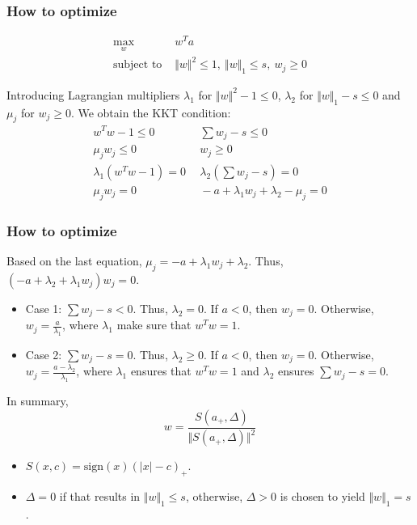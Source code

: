 \documentclass{beamer}
\begin{document}
\begin{frame}
\frametitle{How to optimize}

\begin{eqnarray*}
\max_{w} & w^Ta\\
\text{subject to } & \Vert w \Vert^2 \le 1,~ \Vert w \Vert_1 \le s, ~ w_j \ge 0
\end{eqnarray*}

Introducing Lagrangian multipliers $\lambda_1$ for $\Vert w \Vert^2 -1 \le 0$, $\lambda_2$ for $\Vert w \Vert_1 - s \le 0$ and $\mu_j$ for $w_j \ge 0$. We obtain the KKT condition:
\begin{eqnarray*}
 w^T w -1 \le 0 ~&~
 \sum w_j -s \le 0\\
 \mu_j w_j  \le 0 ~&~
 w_j  \ge 0\\
 \lambda_1 (w^T w -1 ) = 0 ~&~
 \lambda_2 (\sum w_j -s ) = 0\\
 \mu_j w_j =0 ~&~
 -a + \lambda_1 w_j + \lambda_2 - \mu_j =0
\end{eqnarray*}
\end{frame}
\begin{frame}
\frametitle{How to optimize}
Based on the last equation, $\mu_j = -a + \lambda_1 w_j + \lambda_2$. Thus, $(-a + \lambda_2 + \lambda_1 w_j) w_j = 0$.
\begin{itemize}
 \item Case 1: $\sum w_j -s < 0$. Thus, $\lambda_2 = 0$. If $a < 0$, then $w_j = 0$. Otherwise, $w_j = \frac{a}{\lambda_1}$, where $ \lambda_1 $ make sure that $w^T w = 1$.
 \item Case 2: $\sum w_j -s = 0$. Thus, $\lambda_2 \ge 0$. If $a < 0$, then $w_j = 0$. Otherwise, $w_j = \frac{a - \lambda_2}{\lambda_1}$, where $\lambda_1$ ensures that $w^T w = 1$ and $\lambda_2$ ensures $\sum w_j -s = 0$.
\end{itemize}
In summary,
\begin{equation*}
w = \frac{S(a_{+}, \Delta)}{\Vert S(a_{+},\Delta) \Vert^2}
\end{equation*}
\begin{itemize}
  \item $S(x,c) = \text{sign}(x)(\vert x \vert - c)_{+}$.
  \item $\Delta=0$ if that results in $\Vert w \Vert_1 \le s$, otherwise, $\Delta > 0$ is chosen to yield $\Vert w \Vert_1 = s$.
\end{itemize}
\end{frame}
\end{document}
